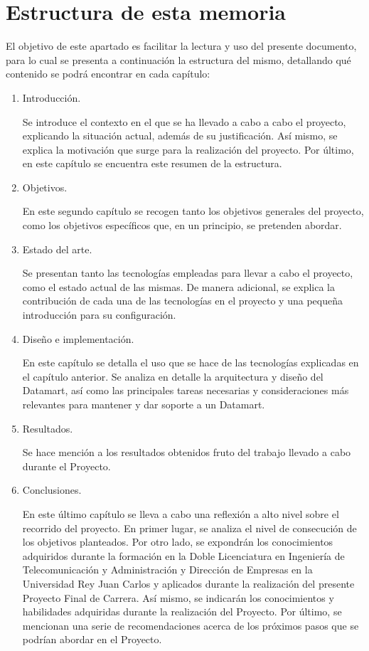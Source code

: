\documentclass[a4paper, 12pt]{book}
\begin{document}
\section{Estructura de esta memoria}
\label{sec:estructura}
El objetivo de este apartado es facilitar la lectura y uso del presente documento, para lo cual se presenta a continuación la estructura del mismo, detallando qué contenido se podrá encontrar en cada capítulo:

\begin{enumerate}
	\item Introducción.\par
	Se introduce el contexto en el que se ha llevado a cabo a cabo el proyecto, explicando la situación actual, además de su justificación. Así mismo, se explica la motivación que surge para la realización del proyecto. Por último, en este capítulo se encuentra este resumen de la estructura. 
	
	\item Objetivos.\par
	En este segundo capítulo se recogen tanto los objetivos generales del proyecto, como los objetivos específicos que, en un principio, se pretenden abordar.
	
	\item Estado del arte.\par
	Se presentan tanto las tecnologías empleadas para llevar a cabo el proyecto, como el estado actual de las mismas. De manera adicional, se explica la contribución de cada una de las tecnologías en el proyecto y una pequeña introducción para su configuración.
		
	\item Diseño e implementación.\par
	En este capítulo se detalla el uso que se hace de las tecnologías explicadas en el capítulo anterior. Se analiza en detalle la arquitectura y diseño del Datamart, así como las principales tareas necesarias y consideraciones más relevantes para mantener y dar soporte a un Datamart.
	
	\item Resultados.\par
	Se hace mención a los resultados obtenidos fruto del trabajo llevado a cabo durante el Proyecto.
	
	\item Conclusiones.\par
	En este último capítulo se lleva a cabo una reflexión a alto nivel sobre el recorrido del proyecto. En primer lugar, se analiza el nivel de consecución de los objetivos planteados. Por otro lado, se expondrán los conocimientos adquiridos durante la formación en la Doble Licenciatura en Ingeniería de Telecomunicación y Administración y Dirección de Empresas en la Universidad Rey Juan Carlos y aplicados durante la realización del presente Proyecto Final de Carrera. Así mismo, se indicarán los conocimientos y habilidades adquiridas durante la realización del Proyecto. Por último, se mencionan una serie de recomendaciones acerca de los próximos pasos que se podrían abordar en el Proyecto.
	
\end{enumerate}
\end{document}
